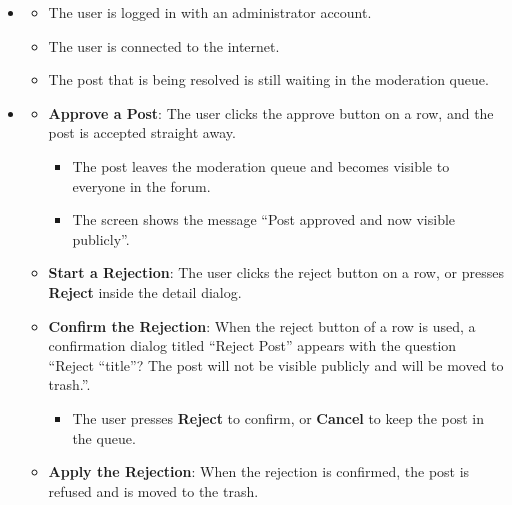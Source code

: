 \begin{itemize}[leftmargin=1.6em,topsep=4pt,itemsep=3pt,parsep=0pt,label=$\bullet$]
    \item {}
        \begin{itemize}[leftmargin=2.2em,topsep=2pt,itemsep=3pt,parsep=0pt,label=$\circ$]
            \item The user is logged in with an administrator account.
            \item The user is connected to the internet.
            \item The post that is being resolved is still waiting in the moderation queue.
        \end{itemize}
    \item {}
        \begin{itemize}[leftmargin=2.2em,topsep=2pt,itemsep=3pt,parsep=0pt,label=$\circ$]
            \item \textbf{Approve a Post}: The user clicks the approve button on a row, and the post is accepted straight away.
                \begin{itemize}[leftmargin=2.2em,topsep=2pt,itemsep=3pt,parsep=0pt,label=$\blacksquare$]
                    \item The post leaves the moderation queue and becomes visible to everyone in the forum.
                    \item The screen shows the message ``Post approved and now visible publicly''.
                \end{itemize}
            \item \textbf{Start a Rejection}: The user clicks the reject button on a row, or presses \textbf{Reject} inside the detail dialog.
            \item \textbf{Confirm the Rejection}: When the reject button of a row is used, a confirmation dialog titled ``Reject Post'' appears with the question ``Reject ``title''? The post will not be visible publicly and will be moved to trash.''.
                \begin{itemize}[leftmargin=2.2em,topsep=2pt,itemsep=3pt,parsep=0pt,label=$\blacksquare$]
                    \item The user presses \textbf{Reject} to confirm, or \textbf{Cancel} to keep the post in the queue.
                \end{itemize}
            \item \textbf{Apply the Rejection}: When the rejection is confirmed, the post is refused and is moved to the trash.

\end{itemize}
\end{itemize}
